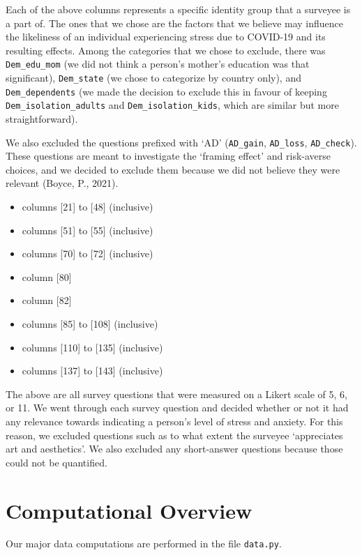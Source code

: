 \documentclass[fontsize=11pt]{article}
\begin{document}
    Each of the above columns represents a specific identity group that a surveyee is a part of. The ones that we chose are the factors that we believe may influence the likeliness of an individual experiencing stress due to COVID-19 and its resulting effects. Among the categories that we chose to exclude, there was \texttt{Dem\_edu\_mom} (we did not think a person’s mother’s education was that significant), \texttt{Dem\_state} (we chose to categorize by country only), and \texttt{Dem\_dependents} (we made the decision to exclude this in favour of keeping \texttt{Dem\_isolation\_adults} and \texttt{Dem\_isolation\_kids}, which are similar but more straightforward).

    We also excluded the questions prefixed with ‘AD’ (\texttt{AD\_gain}, \texttt{AD\_loss}, \texttt{AD\_check}). These questions are meant to investigate the ‘framing effect’ and risk-averse choices, and we decided to exclude them because we did not believe they were relevant (Boyce, P., 2021).
    \begin{itemize}
        \item columns [21] to [48] (inclusive)
        \item columns [51] to [55] (inclusive)
        \item columns [70] to [72] (inclusive)
        \item column [80]
        \item column [82]
        \item columns [85] to [108] (inclusive)
        \item columns [110] to [135] (inclusive)
        \item columns [137] to [143] (inclusive)
    \end{itemize}

    The above are all survey questions that were measured on a Likert scale of 5, 6, or 11. We went through each survey question and decided whether or not it had any relevance towards indicating a person’s level of stress and anxiety. For this reason, we excluded questions such as to what extent the surveyee ‘appreciates art and aesthetics’. We also excluded any short-answer questions because those could not be quantified.

    \section*{Computational Overview}

    Our major data computations are performed in the file \texttt{data.py}.
\end{document}
